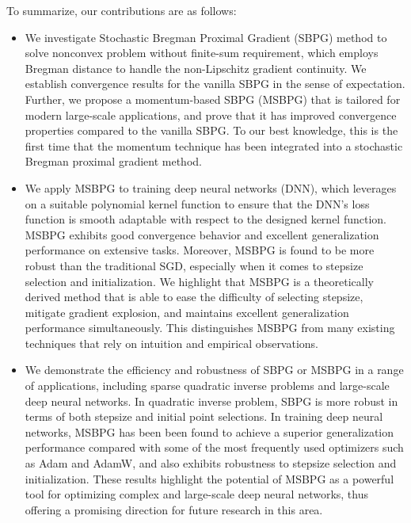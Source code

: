 \documentclass[twoside,11pt]{article}
\begin{document}
 To summarize, our contributions are as follows:
\begin{itemize}
    \item[1.] We investigate Stochastic Bregman Proximal Gradient (SBPG) method to solve nonconvex problem without finite-sum requirement, which employs 
    Bregman distance to handle the non-Lipschitz gradient continuity. We establish convergence results for the vanilla SBPG in the {sense of expectation}. Further, we propose a momentum-based SBPG {(MSBPG)} that is tailored for modern large-scale applications, and prove that it has improved convergence properties compared to the vanilla SBPG. To our best knowledge, this is the first time that the momentum technique has been integrated into {a stochastic Bregman proximal gradient method.} 
    \item[2.] We apply {MSBPG} to training deep neural networks (DNN), which leverages on a suitable polynomial kernel function to ensure that the DNN's loss function is smooth adaptable with respect to the designed kernel function. MSBPG exhibits good convergence behavior and excellent generalization performance on extensive tasks. Moreover, MSBPG is found to be more robust than the traditional SGD, especially when it comes to stepsize selection and initialization. We highlight that MSBPG is a theoretically derived method that is able to ease the difficulty of selecting stepsize, mitigate gradient explosion, and maintains excellent generalization performance simultaneously. This distinguishes MSBPG from many existing techniques that rely on intuition and empirical observations. %
    \item[3.] We demonstrate the efficiency and robustness of SBPG or MSBPG in a range of applications, including sparse quadratic inverse problems and large-scale deep neural networks. In quadratic inverse problem, SBPG is more robust in terms of both stepsize and initial point selections. In training deep neural networks, MSBPG has been been found to achieve a superior generalization performance compared with some of the most frequently used optimizers {such as Adam and AdamW}, and also exhibits robustness to stepsize selection and initialization. These results highlight the potential of MSBPG as a powerful tool for optimizing complex and large-scale deep neural networks, thus offering a promising direction for future research in this area.  

\end{itemize}
\end{document}
